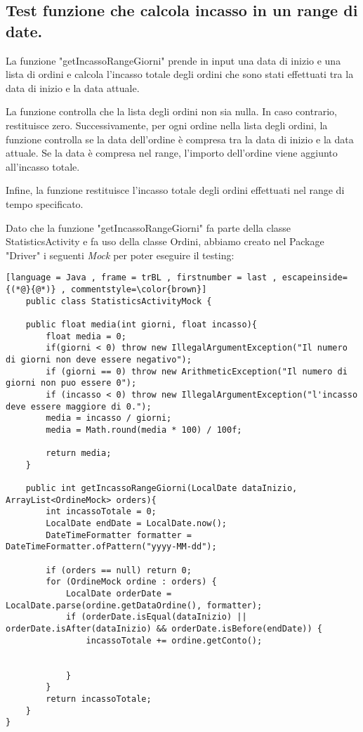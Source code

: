 \subsection{Test funzione che calcola incasso in un range di date.}
\begin{flushleft}
   La funzione "getIncassoRangeGiorni" prende in input una data di inizio e una lista di ordini e calcola l'incasso totale degli ordini che sono stati effettuati tra la data di inizio e la data attuale.

    La funzione controlla che la lista degli ordini non sia nulla. In caso contrario, restituisce zero. Successivamente, per ogni ordine nella lista degli ordini, la funzione controlla se la data dell'ordine è compresa tra la data di inizio e la data attuale. Se la data è compresa nel range, l'importo dell'ordine viene aggiunto all'incasso totale.
    
    Infine, la funzione restituisce l'incasso totale degli ordini effettuati nel range di tempo specificato.
\end{flushleft}
\vspace{0.2cm}

\begin{flushleft}
    Dato che la funzione "getIncassoRangeGiorni" fa parte della classe StatisticsActivity e fa uso della classe Ordini,
    abbiamo creato nel Package "Driver" i seguenti \textit{Mock} per poter eseguire il testing:
\end{flushleft}
\vspace{0.2cm}

\begin{lstlisting}[language = Java , frame = trBL , firstnumber = last , escapeinside={(*@}{@*)} , commentstyle=\color{brown}]
    public class StatisticsActivityMock {

    public float media(int giorni, float incasso){
        float media = 0;
        if(giorni < 0) throw new IllegalArgumentException("Il numero di giorni non deve essere negativo");
        if (giorni == 0) throw new ArithmeticException("Il numero di giorni non puo essere 0");
        if (incasso < 0) throw new IllegalArgumentException("l'incasso deve essere maggiore di 0.");
        media = incasso / giorni;
        media = Math.round(media * 100) / 100f;

        return media;
    }

    public int getIncassoRangeGiorni(LocalDate dataInizio, ArrayList<OrdineMock> orders){
        int incassoTotale = 0;
        LocalDate endDate = LocalDate.now();
        DateTimeFormatter formatter = DateTimeFormatter.ofPattern("yyyy-MM-dd");

        if (orders == null) return 0;
        for (OrdineMock ordine : orders) {
            LocalDate orderDate = LocalDate.parse(ordine.getDataOrdine(), formatter);
            if (orderDate.isEqual(dataInizio) || orderDate.isAfter(dataInizio) && orderDate.isBefore(endDate)) {
                incassoTotale += ordine.getConto();


            }
        }
        return incassoTotale;
    }
}
\end{lstlisting}
\vspace{0.2cm}

